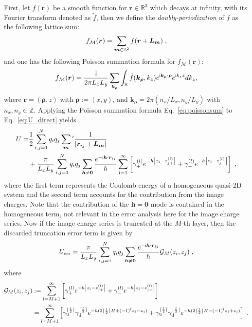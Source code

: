 First, 
let $f(\bm r)$ be a smooth function for $\bm r\in\mathbb R^3$ which decays at infinity, with its Fourier transform denoted as $\widetilde{f}$, then we define the \emph{doubly-periodization} of $f$ as the following lattice sum:
\begin{equation}
f_{\mathcal M} (\bm r)=\sum_{\boldsymbol{m}\in\mathbb{Z}^2} f(\boldsymbol{r}+\boldsymbol{L}_{\bm{m}})\;,
\end{equation}
and one has the following Poisson summation formula for $f_{\mathcal M} (\bm r)$:
\begin{equation}\label{eq:poissonsum}
f_{\mathcal M} (\bm r)=\frac{1}{2 \pi L_x L_y} \sum_{\bm{k}_{\bm{\rho}}} \int_{\mathbb{R}} \tilde{f}(\bm{k}_{\bm{\rho}}, k_z) e^{\mathsf i \bm{k}_{\bm{\rho}} \cdot \boldsymbol{\rho}} e^{\mathsf i k_z z} d k_z,
\end{equation}
where $\bm{r}=(\bm{\rho},z)$ with $\bm{\rho}:=(x,y)$, and $\bm{k}_{\bm{\rho}}=2\pi(n_x/L_x,n_y/L_y)$ with $n_x,n_y\in\mathbb{Z}$. 
Applying the Poisson summation formula Eq.~\eqref{eq:poissonsum} to Eq.~\eqref{eq:U_direct} yields 
\begin{equation}\label{eq::33}
    \begin{split}
        U = & \frac{1}{2}\sum_{i,j=1}^{N}q_iq_j\sum_{\bm{m}}{}^\prime\frac{1}{\left|\bm{r}_{ij}+\boldsymbol{L}_{\bm{m}}\right|} \\
        & + \frac{\pi}{L_xL_y}\sum_{i,j=1}^{N}q_iq_j\sum_{\bm{h}\neq \bm{0}}\frac{e^{-\mathsf i \bm{h}\cdot\bm{r}_{ij}}}{h}  \sum\limits_{l=1}^{\infty}\left[\gamma_+^{(l)}e^{-h\left|z_i-z_{j+}^{(l)}\right|}+\gamma_-^{(l)}e^{-h\left|z_i-z_{j-}^{(l)}\right|}\right] \;,
    \end{split}
\end{equation}
where the first term represents the Coulomb energy of a homogeneous quasi-2D system and the second term accounts for the contribution from the image charges. Note that the contribution of the $\bm{h}=\bm{0}$ mode is contained in the homogeneous term, not relevant in the error analysis here for the image charge series.
Now if the image charge series is truncated at the $M$-th layer, then the discarded truncation error term is given by
\begin{equation}\label{eq:trucation_error}
U_{\text{err}}=\frac{\pi}{L_xL_y}\sum_{i,j=1}^{N}q_iq_j\sum_{\bm{h}\neq \bm{0}}\frac{e^{-\i \bm{h}\cdot\bm{r}_{ij}}}{h}\mathcal{G}_{M}(z_i,z_j)\;,  %
\end{equation}
where 
\begin{equation}\label{eq::rGrrij}
 \begin{split}
        \mathcal{G}_{M}(z_i,z_j)&:=\sum\limits_{l=M+1}^{\infty}\left[\gamma_+^{(l)}e^{-h\left|z_i-z_{j+}^{(l)}\right|}+\gamma_-^{(l)}e^{-h\left|z_i-z_{j-}^{(l)}\right|}\right]\; \\
        &= \sum\limits_{l = M + 1}^{\infty} \left[ \gamma_{\text{u}}^{\lfloor \frac{l}{2} \rfloor}\gamma_{\text{d}}^{\lceil \frac{l}{2} \rceil} e^{-h (2 \lceil \frac{l}{2} \rceil H + (-1)^l z_i - z_j)} + \gamma_{\text{u}}^{\lceil \frac{l}{2} \rceil}\gamma_{\text{d}}^{\lfloor \frac{l}{2} \rfloor} e^{-h (2 \lfloor \frac{l}{2} \rfloor H - (-1)^l z_i + z_j)} \right]\;.
    \end{split}
\end{equation}

